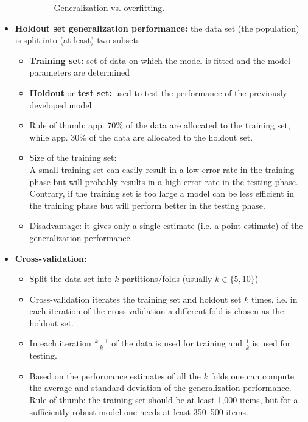 \documentclass[a4paper, landscape, 6pt, fleqn]{scrartcl}
\renewcommand{\emph}[1]{\textbf{#1}}
\begin{document}
\begin{multicols*}{4}
\begin{itemize}
\begin{itemize}
\begin{figure}[H]
\label{fig:GeneralizationVsOverfitting}
\caption{Generalization vs. overfitting.}
\end{figure}
\end{itemize}
\item \emph{Holdout set generalization performance:} the data set (the population) is split into (at least) two subsets.
\begin{itemize}
\item \emph{Training set:} set of data on which the model is fitted and the model parameters are determined
\item \emph{Holdout} or \emph{test set:} used to test the performance of the previously developed model
\item Rule of thumb: app. 70\% of the data are allocated to the training set, while app. 30\% of the data are allocated to the holdout set.
\item Size of the training set: \\
A small training set can easily result in a low error rate in the training phase but will probably results in a high error rate in the testing phase. \\
Contrary, if the training set is too large a model can be less efficient in the training phase but will perform better in the testing phase.
\item Disadvantage: it gives only a single estimate (i.e. a point estimate) of the generalization performance.
\end{itemize}
\item \emph{Cross-validation:}
\begin{itemize}
\item Split the data set into $k$ partitions/folds (usually $k \in \lbrace 5,10 \rbrace$)
\item Cross-validation iterates the training set and holdout set $k$ times, i.e. in each iteration of the cross-validation a different fold is chosen as the holdout set.
\item In each iteration $\frac{k-1}{k}$ of the data is used for training and $\frac{1}{k}$ is used for testing.
\item Based on the performance estimates of all the $k$ folds one can compute the average and standard deviation of the generalization performance. \\
Rule of thumb: the training set should be at least 1,000 items, but for a sufficiently robust model one needs at least 350--500 items.
\end{itemize}
\begin{figure}[H]

\end{figure}
\end{itemize}
\end{multicols*}
\end{document}
